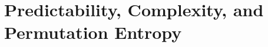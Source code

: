 \documentclass[%
pre,
reprint,
superscriptaddress,
showpacs,
nofootinbib,
nobibnotes,
 amsmath,amssymb,
 aps,
]{revtex4-1}
\newcommand{\cmark}{\ding{51}}
\newcommand{\svd}{{\tt dgesdd}\xspace}
\begin{document}
%
%




 \section{Predictability, Complexity, and Permutation Entropy %
 } %
 \label{sec:results}


\end{document}
